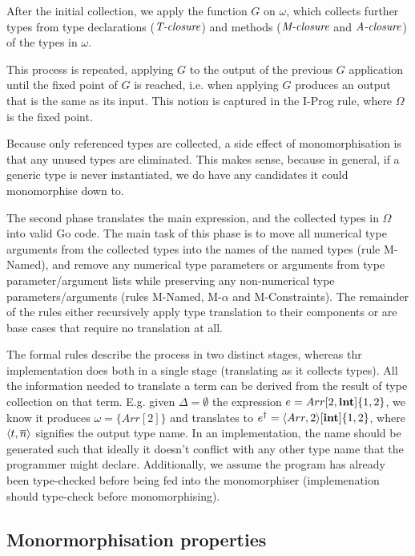 After the initial collection, we apply the function $G$ on $\omega$, which
collects further types from type declarations ($\textit{T-closure}$) and methods
($\textit{M-closure}$ and $\textit{A-closure}$) of the types in $\omega$.

This process is repeated, applying $G$ to the output of the previous $G$
application until the fixed point of $G$ is reached, i.e. when applying $G$
produces an output that is the same as its input. This notion is captured in the
I-Prog rule, where $\Omega$ is the fixed point.

Because only referenced types are collected, a side effect of monomorphisation
is that any unused types are eliminated. This makes sense, because in general,
if a generic type is never instantiated, we do have any candidates it could
monomorphise down to.

The second phase translates the main expression, and the collected types in
$\Omega$ into valid Go code. The main task of this phase is to move all
numerical type arguments from the collected types into the names of the named
types (rule M-Named), and remove any numerical type parameters or arguments from
type parameter/argument lists while preserving any non-numerical type
parameters/arguments (rules M-Named, M-$\alpha$ and M-Constraints). The
remainder of the rules either recursively apply type translation to their
components or are base cases that require no translation at all.

The formal rules describe the process in two distinct stages, whereas thr
implementation does both in a single stage (translating as it collects types).
All the information needed to translate a term can be derived from the result of
type collection on that term. E.g. given $\Delta = \emptyset$ the expression $e
    = Arr[2, \texttt{\bf int}]\{1, 2\}$, we know it produces $\omega = \{Arr[2]\}$ and
translates to $e^\dagger = \langle Arr, 2 \rangle[\texttt{\bf int}]\{1, 2\}$, where $\langle t,
        \overline{n} \rangle$ signifies the output type name. In an implementation, the name should
be generated such that ideally it doesn't conflict with any other type name that
the programmer might declare. Additionally, we assume the program has already
been type-checked before being fed into the monomorphiser (implemenation should
type-check before monomorphising).



\subsection{Monormorphisation properties}

